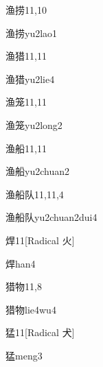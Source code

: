 \begin{entry}{渔捞}{11,10}
  \begin{phonetics}{渔捞}{yu2lao1}
  \end{phonetics}
\end{entry}

\begin{entry}{渔猎}{11,11}
  \begin{phonetics}{渔猎}{yu2lie4}
  \end{phonetics}
\end{entry}

\begin{entry}{渔笼}{11,11}
  \begin{phonetics}{渔笼}{yu2long2}
  \end{phonetics}
\end{entry}

\begin{entry}{渔船}{11,11}
  \begin{phonetics}{渔船}{yu2chuan2}
  \end{phonetics}
\end{entry}

\begin{entry}{渔船队}{11,11,4}
  \begin{phonetics}{渔船队}{yu2chuan2dui4}
  \end{phonetics}
\end{entry}

\begin{entry}{焊}{11}[Radical 火]
  \begin{phonetics}{焊}{han4}
  \end{phonetics}
\end{entry}

\begin{entry}{猎物}{11,8}
  \begin{phonetics}{猎物}{lie4wu4}
  \end{phonetics}
\end{entry}

\begin{entry}{猛}{11}[Radical 犬]
  \begin{phonetics}{猛}{meng3}
  \end{phonetics}
\end{entry}


